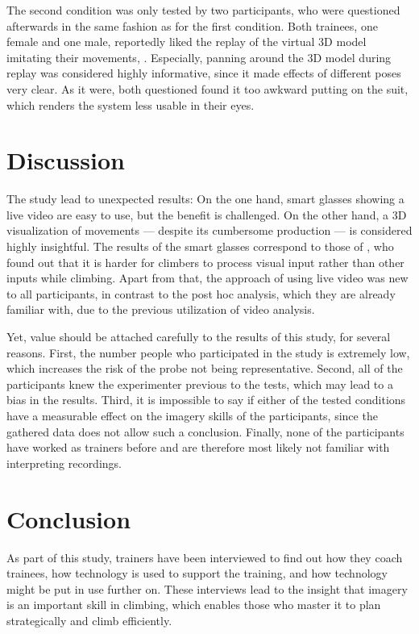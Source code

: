 The second condition was only tested by two participants, who were questioned afterwards in the same fashion as for the first condition. Both trainees, one female and one male, reportedly liked the replay of the virtual 3D model imitating their movements, \cf {}. Especially, panning around the 3D model during replay was considered highly informative, since it made effects of different poses very clear. As it were, both questioned found it too awkward putting on the suit, which renders the system less usable in their eyes.
\section{Discussion}

The study lead to unexpected results: On the one hand, smart glasses showing a live video are easy to use, but the benefit is challenged. On the other hand, a 3D visualization of movements --- despite its cumbersome production --- is considered highly insightful. The results of the smart glasses correspond to those of \textcite{Kosmalla:2016:CIP:2858036.2858562}, who found out that it is harder for climbers to process visual input rather than other inputs while climbing. Apart from that, the approach of using live video was new to all participants, in contrast to the post hoc analysis, which they are already familiar with, due to the previous utilization of video analysis.

Yet, value should be attached carefully to the results of this study, for several reasons. First, the number people who participated in the study is extremely low, which increases the risk of the probe not being representative. Second, all of the participants knew the experimenter previous to the tests, which may lead to a bias in the results. Third, it is impossible to say if either of the tested conditions have a measurable effect on the imagery skills of the participants, since the gathered data does not allow such a conclusion. Finally, none of the participants have worked as trainers before and are therefore most likely not familiar with interpreting recordings.
\section{Conclusion}

As part of this study, trainers have been interviewed to find out how they coach trainees, how technology is used to support the training, and how technology might be put in use further on. These interviews lead to the insight that imagery is an important skill in climbing, which enables those who master it to plan strategically and climb efficiently.

